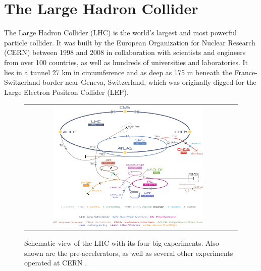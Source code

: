 

\section{The Large Hadron Collider}

The Large Hadron Collider (LHC) is the world's largest and most powerful particle collider\cite{ipac11:lamont}. It was built by the European Organization for Nuclear Research (CERN) between 1998 and 2008 in collaboration with scientists and engineers from over 100 countries, as well as hundreds of universities and laboratories. It lies in a tunnel 27 km in circumference and as deep as 175 m beneath the France-Switzerland border near Geneva, Switzerland, which was originally digged for the Large Electron Positron Collider (LEP). 

\begin{figure}[tbh!]
	\centering
	\begin{tabular}{cc}
		\includegraphics[width=0.75\textwidth]{detector/pics/CERN_complex.jpg}
	\end{tabular}
	\caption{Schematic view of the LHC with its four big experiments. Also shown are the pre-accelerators, as well as several other experiments operated at CERN \cite{Collider:1998498}.}
	\label{fig:CERN_complex}
\end{figure}

